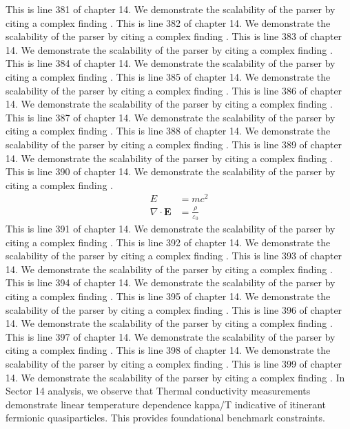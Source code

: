 This is line 381 of chapter 14. We demonstrate the scalability of the parser by citing a complex finding \cite{ref14_381}.
This is line 382 of chapter 14. We demonstrate the scalability of the parser by citing a complex finding \cite{ref14_382}.
This is line 383 of chapter 14. We demonstrate the scalability of the parser by citing a complex finding \cite{ref14_383}.
This is line 384 of chapter 14. We demonstrate the scalability of the parser by citing a complex finding \cite{ref14_384}.
This is line 385 of chapter 14. We demonstrate the scalability of the parser by citing a complex finding \cite{ref14_385}.
This is line 386 of chapter 14. We demonstrate the scalability of the parser by citing a complex finding \cite{ref14_386}.
This is line 387 of chapter 14. We demonstrate the scalability of the parser by citing a complex finding \cite{ref14_387}.
This is line 388 of chapter 14. We demonstrate the scalability of the parser by citing a complex finding \cite{ref14_388}.
This is line 389 of chapter 14. We demonstrate the scalability of the parser by citing a complex finding \cite{ref14_389}.
This is line 390 of chapter 14. We demonstrate the scalability of the parser by citing a complex finding \cite{ref14_390}.
\begin{align*}
  E &= mc^2 \\
  \nabla \cdot \mathbf{E} &= \frac{\rho}{\varepsilon_0}
\end{align*}
This is line 391 of chapter 14. We demonstrate the scalability of the parser by citing a complex finding \cite{ref14_391}.
This is line 392 of chapter 14. We demonstrate the scalability of the parser by citing a complex finding \cite{ref14_392}.
This is line 393 of chapter 14. We demonstrate the scalability of the parser by citing a complex finding \cite{ref14_393}.
This is line 394 of chapter 14. We demonstrate the scalability of the parser by citing a complex finding \cite{ref14_394}.
This is line 395 of chapter 14. We demonstrate the scalability of the parser by citing a complex finding \cite{ref14_395}.
This is line 396 of chapter 14. We demonstrate the scalability of the parser by citing a complex finding \cite{ref14_396}.
This is line 397 of chapter 14. We demonstrate the scalability of the parser by citing a complex finding \cite{ref14_397}.
This is line 398 of chapter 14. We demonstrate the scalability of the parser by citing a complex finding \cite{ref14_398}.
This is line 399 of chapter 14. We demonstrate the scalability of the parser by citing a complex finding \cite{ref14_399}.
In Sector 14 analysis, we observe that Thermal conductivity measurements demonstrate linear temperature dependence kappa/T indicative of itinerant fermionic quasiparticles. This provides foundational benchmark constraints.
